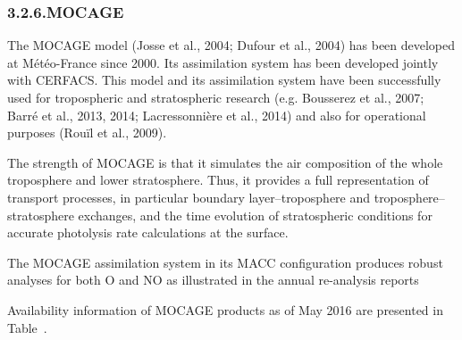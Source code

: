 \documentclass[9pt]{article}
\begin{document}
\subsubsection{3.2.6.\hspace*{0.5em}MOCAGE}\label{sec-mocage}%

\noindent{}The MOCAGE model (Josse et al., 2004; Dufour et al., 2004) has been developed at Météo-France since 2000. 
Its assimilation system has been developed jointly with CERFACS. 
This model and its assimilation system have been successfully used for tropospheric and stratospheric research (e.g. Bousserez et al., 2007; Barré et al., 2013, 2014; Lacressonnière et al., 2014) and also for operational purposes (Rouïl et al., 2009).%

The strength of MOCAGE is that it simulates the air composition of the whole troposphere and lower stratosphere. 
Thus, it provides a full representation of transport processes, in particular boundary layer–troposphere and troposphere–stratosphere exchanges, and the time evolution of stratospheric conditions for accurate photolysis rate calculations at the surface.%

The MOCAGE assimilation system in its MACC conﬁguration produces robust analyses for both O and NO as illustrated in the annual re-analysis reports %

Availability information of MOCAGE products as of May 2016 are presented in Table~.%
\end{document}
